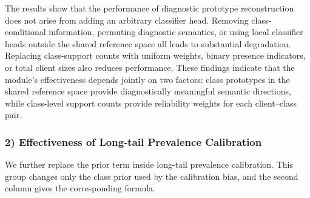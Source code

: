 \documentclass[letterpaper]{article} %
\begin{document}
The results show that the performance of diagnostic prototype reconstruction does not arise from adding an arbitrary classifier head. Removing class-conditional information, permuting diagnostic semantics, or using local classifier heads outside the shared reference space all leads to substantial degradation. Replacing class-support counts with uniform weights, binary presence indicators, or total client sizes also reduces performance. These findings indicate that the module’s effectiveness depends jointly on two factors: class prototypes in the shared reference space provide diagnostically meaningful semantic directions, while class-level support counts provide reliability weights for each client–class pair.

\subsubsection{2) Effectiveness of Long-tail Prevalence Calibration}
We further replace the prior term inside long-tail prevalence calibration. This group changes only the class prior used by the calibration bias, and the second column gives the corresponding formula.

\begin{center}
\centering
{}
\label{tab:prevalence-internal-ablation}
\scriptsize
\setlength{\tabcolsep}{2.8pt}
\end{center}
\end{document}
